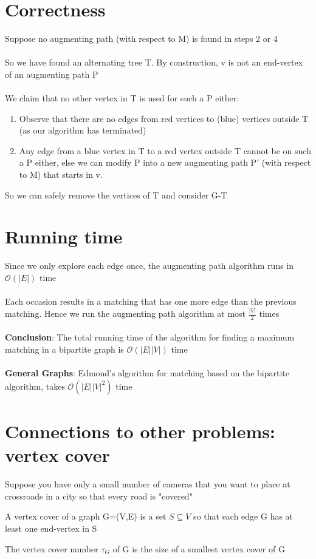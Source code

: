 \documentclass{article}[18pt]
\begin{document}
\section{Correctness}
Suppose no augmenting path (with respect to M) is found in steps 2 or 4\\
\\
So we have found an alternating tree T. By construction, v is not an end-vertex of an augmenting path P\\
\\
We claim that no other vertex in T is used for such a P either:
\begin{enumerate}
	\item Observe that there are no edges from red vertices to (blue) vertices outside T (as our algorithm has terminated)
	\item Any edge from a blue vertex in T to a red vertex outside T cannot be on such a P either, else we can modify P into a new augmenting path P' (with respect to M) that starts in v.
\end{enumerate}
So we can safely remove the vertices of T and consider G-T
\section{Running time}
Since we only explore each edge once, the augmenting path algorithm runs in $\mathcal{O}(|E|)$ time\\
\\
Each occasion results in a matching that has one more edge than the previous matching. Hence we run the augmenting path algorithm at most $\frac{|V|}{2}$ times\\
\\
\textbf{Conclusion}: The total running time of the algorithm for finding a maximum matching in a bipartite graph is $\mathcal{O}(|E||V|)$ time\\
\\
\textbf{General Graphs}: Edmond's algorithm for matching based on the bipartite algorithm, takes $\mathcal{O}(|E||V|^2)$ time
\section{Connections to other problems: vertex cover}
Suppose you have only a small number of cameras that you want to place at crossroads in a city so that every road is "covered"
\begin{defin}
A vertex cover of a graph G=(V,E) is a set $S\subseteq V$ so that each edge G has at least one end-vertex in S
\end{defin}
\begin{defin}
The vertex cover number $\tau_G$ of G is the size of a smallest vertex cover of G
\end{defin}
\end{document}
